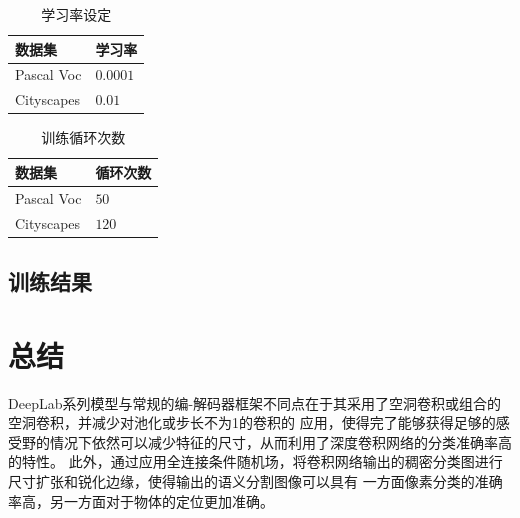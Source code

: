 \documentclass[10pt, a4paper]{article}
\begin{document}
\begin{table}[h]
\begin{center}  
\begin{tabular}{ll}
    \toprule
    数据集 & 学习率\\
    \midrule
    Pascal Voc & $0.0001$ \\
    Cityscapes & $0.01$ \\
    \bottomrule
\end{tabular}
\end{center}
\caption{学习率设定}
\label{t1}
\end{table}

\begin{table}[h]
\begin{center}  
\begin{tabular}{ll}
    \toprule
    数据集 & 循环次数\\
    \midrule
    Pascal Voc & $50$ \\
    Cityscapes & $120$ \\
    \bottomrule
\end{tabular}
\end{center}
\caption{训练循环次数}
\label{t2}
\end{table}

\subsection{训练结果}


\section{总结}
DeepLab系列模型与常规的编-解码器框架不同点在于其采用了空洞卷积或组合的空洞卷积，并减少对池化或步长不为1的卷积的
应用，使得完了能够获得足够的感受野的情况下依然可以减少特征的尺寸，从而利用了深度卷积网络的分类准确率高的特性。
此外，通过应用全连接条件随机场，将卷积网络输出的稠密分类图进行尺寸扩张和锐化边缘，使得输出的语义分割图像可以具有
一方面像素分类的准确率高，另一方面对于物体的定位更加准确。

\clearpage
\newpage
{}
\nocite{*}
\printbibliography[heading=bibliography,title=参考文献]
\end{document}
